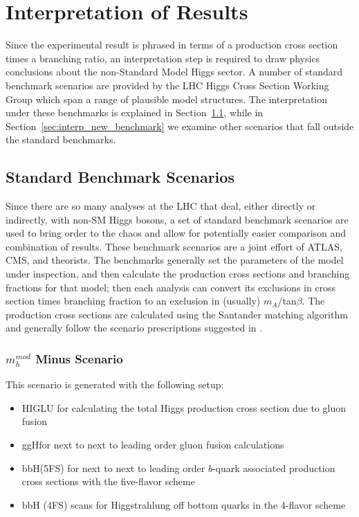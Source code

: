 

\chapter[Interpretation]{Interpretation of Results}

Since the experimental result is phrased in terms of a production cross section
times a branching ratio, an interpretation step is required to draw physics conclusions
about the non-Standard Model Higgs sector. A number of standard benchmark scenarios
are provided by the LHC Higgs Cross Section Working Group \cite{mssm_xsec_wg} which span 
a range of plausible model structures.  The interpretation under these benchmarks
is explained in Section~\ref{sec:interp_benchmark}, while in Section~\ref{sec:interp_new_benchmark} we examine other scenarios
that fall outside the standard benchmarks.

\section{Standard Benchmark Scenarios}
\label{sec:interp_benchmark}
Since there are so many analyses at the LHC that deal, either directly or indirectly,
with non-SM Higgs bosons, a set of standard benchmark scenarios are used to bring
order to the chaos and allow for potentially easier comparison and combination 
of results.  These benchmark scenarios are a joint effort of ATLAS, CMS, and 
theorists.  The benchmarks generally set the parameters of the model under inspection,
and then calculate the production cross sections and branching fractions for that
model; then each analysis can convert its exclusions in cross section times 
branching fraction to an exclusion in (usually) $m_A$/tan$\beta$.  The production
cross sections are calculated using the Santander matching algorithm \cite{santander} 
and generally follow the scenario prescriptions suggested in \cite{Carena-2}.


\subsection{$m_h^{mod}$ Minus Scenario}
This scenario is generated with the following setup:
\begin{itemize}
    \item HIGLU for calculating the total Higgs production cross section due to gluon fusion \cite{higlu}
    \item ggH\@NNLO for next to next to leading order gluon fusion calculations \cite{gghnnlo} 
    \item bbH\@NNLO (5FS) for next to next to leading order $b$-quark associated production cross sections with the five-flavor scheme \cite{bbhnnlo}
    \item bbH (4FS) scans for Higgstrahlung off bottom quarks in the 4-flavor scheme \cite{bbh_4fs_1} \cite{bbh_4fs_2}
\end{itemize}


